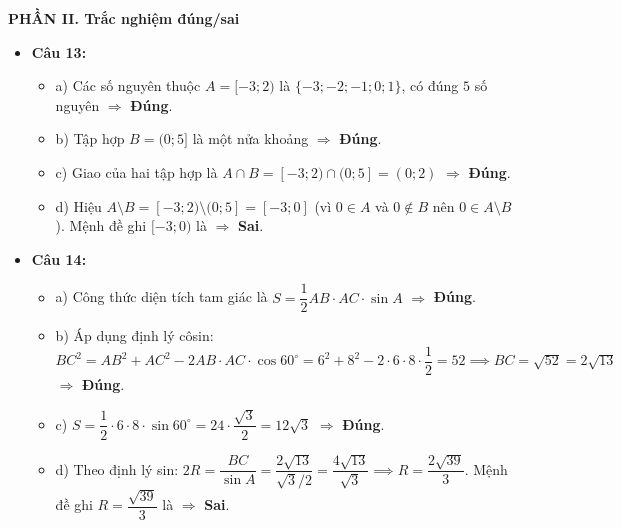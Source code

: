 \documentclass[12pt,a4paper]{article}
\begin{document}
\vspace{0.2cm}
\textbf{PHẦN II. Trắc nghiệm đúng/sai}
\begin{itemize}[leftmargin=0.6cm, itemsep=3pt]
    \item \textbf{Câu 13:}
    \begin{itemize}
        \item a) Các số nguyên thuộc $A = [-3; 2)$ là $\{-3; -2; -1; 0; 1\}$, có đúng $5$ số nguyên $\Rightarrow$ \textbf{Đúng}.
        \item b) Tập hợp $B = (0; 5]$ là một nửa khoảng $\Rightarrow$ \textbf{Đúng}.
        \item c) Giao của hai tập hợp là $A \cap B = [-3; 2) \cap (0; 5] = (0; 2)$ $\Rightarrow$ \textbf{Đúng}.
        \item d) Hiệu $A \setminus B = [-3; 2) \setminus (0; 5] = [-3; 0]$ (vì $0 \in A$ và $0 \notin B$ nên $0 \in A \setminus B$). Mệnh đề ghi $[-3; 0)$ là $\Rightarrow$ \textbf{Sai}.
    \end{itemize}

    \item \textbf{Câu 14:}
    \begin{itemize}
        \item a) Công thức diện tích tam giác là $S = \dfrac{1}{2} AB \cdot AC \cdot \sin A$ $\Rightarrow$ \textbf{Đúng}.
        \item b) Áp dụng định lý côsin: $BC^2 = AB^2 + AC^2 - 2 AB \cdot AC \cdot \cos 60^\circ = 6^2 + 8^2 - 2 \cdot 6 \cdot 8 \cdot \dfrac{1}{2} = 52 \implies BC = \sqrt{52} = 2\sqrt{13}$ $\Rightarrow$ \textbf{Đúng}.
        \item c) $S = \dfrac{1}{2} \cdot 6 \cdot 8 \cdot \sin 60^\circ = 24 \cdot \dfrac{\sqrt{3}}{2} = 12\sqrt{3}$ $\Rightarrow$ \textbf{Đúng}.
        \item d) Theo định lý sin: $2R = \dfrac{BC}{\sin A} = \dfrac{2\sqrt{13}}{\sqrt{3}/2} = \dfrac{4\sqrt{13}}{\sqrt{3}} \implies R = \dfrac{2\sqrt{39}}{3}$. Mệnh đề ghi $R = \dfrac{\sqrt{39}}{3}$ là $\Rightarrow$ \textbf{Sai}.
    \end{itemize}
\end{itemize}
\end{document}
